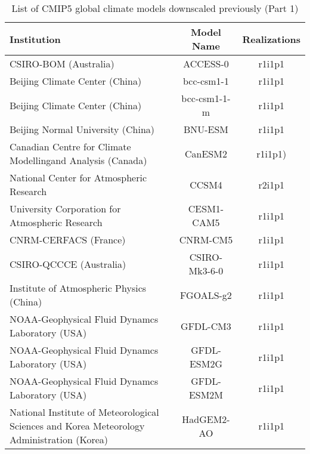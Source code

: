 \documentclass[]{scrartcl}
\begin{document}
\begin{appendices}
\begin{table}[ht]
	\caption{List of CMIP5 global climate models downscaled previously (Part 1)}\label{table:gcm3}
	\begin{center}
		\begin{tabularx}{\linewidth}{|L|cc|} 
			\hline
			\textbf{Institution} & \textbf{Model Name} & \textbf{Realizations}  \\
			\hline
			CSIRO-BOM (Australia)                     & ACCESS-0 & r1i1p1   \\
			Beijing Climate Center (China) & bcc-csm1-1 & r1i1p1  \\
			Beijing Climate Center (China) & bcc-csm1-1-m & r1i1p1  \\			
			Beijing Normal University (China) & BNU-ESM & r1i1p1  \\						
						Canadian Centre for Climate Modelling\newline and Analysis (Canada) & CanESM2 & r1i1p1) \\
National Center for Atmospheric Research & CCSM4 & r2i1p1 \\
University Corporation for Atmospheric Research & CESM1-CAM5 & r1i1p1 \\

CNRM-CERFACS (France) & CNRM-CM5 & r1i1p1 \\  	
CSIRO-QCCCE (Australia)                   & CSIRO-Mk3-6-0 & r1i1p1   \\	
Institute of Atmospheric Physics (China) & FGOALS-g2 & r1i1p1 \\
NOAA-Geophysical Fluid Dynamcs Laboratory (USA) & GFDL-CM3 & r1i1p1 \\
NOAA-Geophysical Fluid Dynamcs Laboratory (USA) & GFDL-ESM2G & r1i1p1 \\			
NOAA-Geophysical Fluid Dynamcs Laboratory (USA) & GFDL-ESM2M & r1i1p1 \\
National Institute of Meteorological Sciences and Korea Meteorology Administration (Korea) & HadGEM2-AO & r1i1p1 \\ 
			
			\hline
		\end{tabularx}
	\end{center}
\end{table}


\end{appendices}
\end{document}
